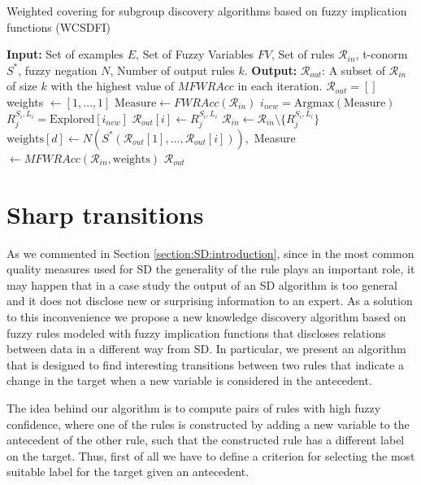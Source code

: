 \begin{algorithm}[t]
	\caption{Weighted covering for subgroup discovery algorithms based on fuzzy implication functions (WCSDFI)}\label{alg:WCSDFI}
	\begin{algorithmic}
		\State \textbf{Input:} Set of examples $E$, Set of Fuzzy Variables $FV$, Set of rules $\mathcal{R}_{in}$, t-conorm $S^*$, fuzzy negation $N$, Number of output rules $k$.
		\State \textbf{Output:} $\mathcal{R}_{out}$: A subset of  $\mathcal{R}_{in}$ of size $k$ with the highest value of $MFWRAcc$ in each iteration.
		\State
		\State $\mathcal{R}_{out} = []$
		\State weights $\leftarrow [1,\dots,1]$
		\State $\text{Measure} \leftarrow FWRAcc(\mathcal{R}_{in})$
		\State $i_{new} = \text{Argmax} (\text{Measure})$
		\State $R_j^{S_i,L_i} = \text{Explored}[i_{new}]$
		\State $\mathcal{R}_{out}[i] \leftarrow R_j^{S_i,L_i}$
		\State $\mathcal{R}_{in} \leftarrow \mathcal{R}_{in} \setminus \{R_j^{S_i,L_i}\}$
		\State $\text{weights}[d] \leftarrow N(S^*(\mathcal{R}_{out}[1], \dots, \mathcal{R}_{out}[i])),$
		\EndFor
		\State Measure $\leftarrow MFWRAcc(\mathcal{R}_{in},\text{weights})$
		\EndFor
		\State \Return  $\mathcal{R}_{out}$
		\EndFunction
	\end{algorithmic}
\end{algorithm}


\section{Sharp transitions}\label{section:sharp_transitions}

As we commented in Section \ref{section:SD:introduction}, since in the most common quality measures used for SD the generality of the rule plays an important role, it may happen that in a case study the output of an SD algorithm is too general and it does not disclose new or surprising information to an expert. As a solution to this inconvenience we propose a new knowledge discovery algorithm based on fuzzy rules modeled with fuzzy implication functions that discloses relations between data in a different way from SD. In particular, we present an algorithm that is designed to find interesting transitions between two rules that indicate a change in the target when a new variable is considered in the antecedent.  

The idea behind our algorithm is to compute pairs of rules with high fuzzy confidence, where one of the rules is constructed by adding a new variable to the antecedent of the other rule, such that the constructed rule has a different label on the target. Thus, first of all we have to define a criterion for selecting the most suitable label for the target given an antecedent.

